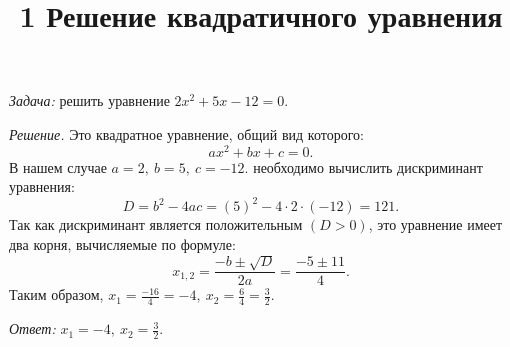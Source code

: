 \documentclass[a4paper,12pt]{article}
\title{\textbf{1 Решение квадратичного уравнения}}
\date{}
\begin{document}

\maketitle
\textit{Задача:} решить уравнение \(2x^2 + 5x - 12 = 0.\)
\par\textit{Решение.} Это квадратное уравнение, общий вид которого:
    \[ax^2 +bx +c =0.\]
В нашем случае \(a = 2,\ b = 5,\ c = -12.\)
 необходимо вычислить дискриминант уравнения:
    \[D = b^2 - 4ac = (5)^2 - 4 \cdot 2 \cdot (-12) = 121.\]
Так как дискриминант является положительным \((D > 0)\), это уравнение имеет два корня, вычисляемые по формуле:
    \[x_{1,2} = \frac{-b\pm\sqrt{D}}{2a} = \frac{-5\pm11}{4}.\]
Таким образом, \(x_1 = \frac{-16}{4} = -4,\ x_2 = \frac{6}{4} = \frac{3}{2}\).
\par\textit{Ответ:} \(x_1 = -4,\ x_2 = \frac{3}{2}\).
\end{document}
